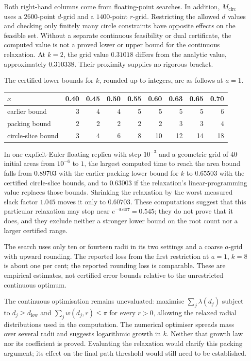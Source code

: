 Both right-hand columns come from floating-point searches. In addition,
$M_{\mathrm{circ}}$ uses a $2600$-point $d$-grid and a $1400$-point
$r$-grid. Restricting the allowed $d$ values and checking only finitely
many circle constraints have opposite effects on the feasible set.
Without a separate continuous feasibility or dual certificate, the
computed value is not a proved lower or upper bound for the continuous
relaxation. At $k=2$, the grid value $0.31018$ differs from the analytic
value, approximately $0.310338$. Their proximity supplies no rigorous
bracket.

The certified lower bounds for $k$, rounded up to integers, are as
follows at $a=1$.

\begin{center}
\begin{tabular}{@{}lrrrrrrrr@{}}
\toprule
$x$ & 0.40 & 0.45 & 0.50 & 0.55 & 0.60 & 0.63 & 0.65 & 0.70 \\
\midrule
earlier bound & 3 & 4 & 4 & 5 & 5 & 5 & 5 & 6 \\
packing bound & 2 & 2 & 2 & 2 & 2 & 3 & 3 & 4 \\
circle-slice bound & 3 & 4 & 6 & 8 & 10 & 12 & 14 & 18 \\
\bottomrule
\end{tabular}
\end{center}

In one explicit-Euler floating replica with step $10^{-3}$ and a geometric grid
of $40$ initial areas from $10^{-6}$ to $1$, the largest computed time to reach the area bound
falls from $0.89703$ with the earlier packing lower bound for $k$ to
$0.65503$ with the certified circle-slice bounds, and to $0.63003$ if
the relaxation's linear-programming value replaces those bounds.  Shrinking the relaxation by the worst
measured slack factor $1.045$ moves it only to $0.60703$.  These computations
suggest that this particular relaxation may stop near
$e^{-0.607}=0.545$; they do not prove that it does, and they exclude neither a stronger lower bound on the root count nor a larger certified
range.

The search uses only ten or fourteen radii in its two settings and a
coarse $a$-grid with upward rounding. The reported loss from the first
restriction at $a=1$, $k=8$ is about one per cent; the reported rounding
loss is comparable. These are empirical estimates, not certified error
bounds relative to the unrestricted continuous optimum.

The continuous optimisation remains unevaluated: maximise
$\sum_j\lambda(d_j)$ subject to $d_j\ge d_{\mathrm{low}}$ and
$\sum_jw(d_j,r)\le\pi$ for every $r>0$, allowing the relaxed radial
distributions used in the computation. The numerical optimiser spreads
mass over several radii and suggests logarithmic growth in $k$.
Neither that growth law nor its coefficient is proved. Evaluating the
relaxation would clarify this packing argument; its effect on the final
path threshold would still need to be established.

